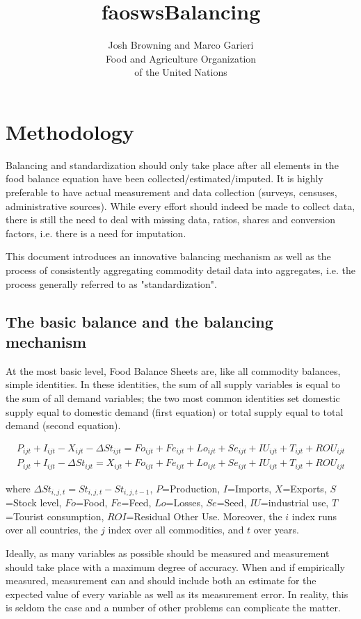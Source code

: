\documentclass[nojss]{jss}
\title{\bf faoswsBalancing}
\author{Josh Browning and Marco Garieri \\ Food and Agriculture Organization \\ of
  the United Nations}
\begin{document}


\newpage

\section{Methodology}
Balancing and standardization should only take place after all elements in the food balance equation have been collected/estimated/imputed.  It is highly preferable to have actual measurement and data collection (surveys, censuses, administrative sources). While every effort should indeed be made to collect data, there is still the need to deal with missing data, ratios, shares and conversion factors, i.e. there is a need for imputation.

This document introduces an innovative balancing mechanism as well as the process of consistently aggregating commodity detail data into aggregates, i.e. the process generally referred to as "standardization".


\subsection{The basic balance and the balancing mechanism}

At the most basic level, Food Balance Sheets are, like all commodity balances, simple identities. In these identities, the sum of all supply variables is equal to the sum of all demand variables; the two most common identities set domestic supply equal to domestic demand (first equation) or total supply equal to total demand (second equation). 

\begin{align}
     P_{ijt} + I_{ijt} - X_{ijt} - \Delta St_{ijt} = Fo_{ijt} + Fe_{ijt} + Lo_{ijt} + Se_{ijt} + IU_{ijt} + T_{ijt}  + ROU_{ijt}\\
     P_{ijt} + I_{ijt} - \Delta St_{ijt} = X_{ijt} + Fo_{ijt} + Fe_{ijt} + Lo_{ijt} + Se_{ijt} + IU_{ijt} + T_{ijt} + ROU_{ijt}
\end{align}

where $\Delta St_{i,j,t} = St_{i,j,t} - St_{i,j,t-1}$, $P$=Production, $I$=Imports, $X$=Exports, $S$=Stock level, $Fo$=Food, $Fe$=Feed, $Lo$=Losses, $Se$=Seed, $IU$=industrial use, $T$=Tourist consumption, $ROI$=Residual Other Use.  Moreover, the $i$ index runs over all countries, the $j$ index over all commodities, and $t$ over years.

Ideally, as many variables as possible should be measured and measurement should take place with a maximum degree of accuracy. When and if empirically measured, measurement can and should include both an estimate for the expected value of every variable as well as its measurement error. In reality, this is seldom the case and a number of other problems can complicate the matter. 
\end{document}
